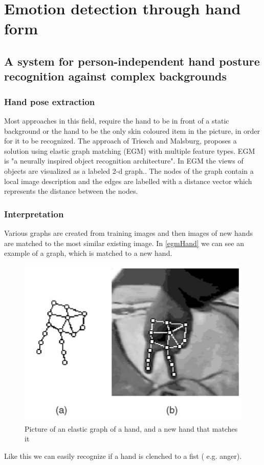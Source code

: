 \documentclass[conference]{IEEEtran}
\begin{document}
\section{Emotion detection through hand form}
\label{sec:emotionHand}
\subsection{A system for person-independent hand posture recognition against complex backgrounds}
\subsubsection{Hand pose extraction}
Most approaches in this field, require the hand to be in front of a static background or the hand to be the only skin coloured item in the picture, in order for it to be recognized\cite{cui1995learning,hunter1995posture,kohler1997technical,min1999visual}. The approach of Triesch and Malsburg\cite{triesch2001system}, proposes a solution using elastic graph matching (EGM) with multiple feature types. EGM is "a neurally inspired object recognition architecture"\cite{lades1993distortion}. In EGM the views of objects are visualized as a labeled 2-d graph.\cite{triesch2001system}. The nodes of the graph contain a local image description and the edges are labelled with a distance vector which represents the distance between the nodes. 


\subsubsection{Interpretation}
Various graphs are created from training images and then images of new hands are matched to the most similar existing image. In \autoref{egmHand} we can see an example of a graph, which is matched to a new hand.
\begin{figure}[H]
\centering
\includegraphics[width=\linewidth]{egmHand.jpg}
\caption{Picture of an elastic graph of a hand, and a new hand that matches it\cite{triesch2001system}}
\label{fig:egmHand}
\end{figure}
Like this we can easily recognize if a hand is clenched to a fist ( e.g. anger).
\end{document}
